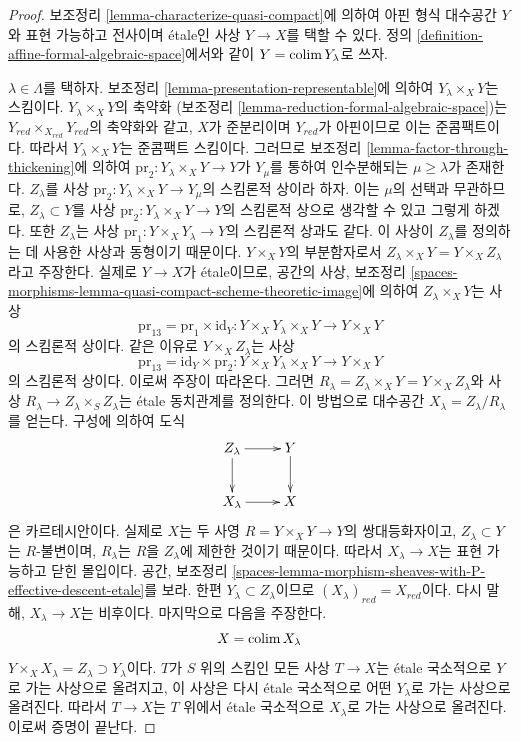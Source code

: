 \begin{proof}
보조정리 \ref{lemma-characterize-quasi-compact}에 의하여
아핀 형식 대수공간 $Y$와 표현 가능하고 전사이며 \'etale인 사상
$Y \to X$를 택할 수 있다. 정의
\ref{definition-affine-formal-algebraic-space}에서와 같이
$Y = \mathop{\mathrm{colim}}\nolimits Y_\lambda$로 쓰자.

\medskip\noindent
$\lambda \in \Lambda$를 택하자. 보조정리
\ref{lemma-presentation-representable}에 의하여
$Y_\lambda \times_X Y$는 스킴이다. $Y_\lambda \times_X Y$의 축약화
(보조정리 \ref{lemma-reduction-formal-algebraic-space})는
$Y_{red} \times_{X_{red}} Y_{red}$의 축약화와 같고,
$X$가 준분리이며 $Y_{red}$가 아핀이므로 이는 준콤팩트이다.
따라서 $Y_\lambda \times_X Y$는 준콤팩트 스킴이다.
그러므로 보조정리 \ref{lemma-factor-through-thickening}에 의하여
$\text{pr}_2 : Y_\lambda \times_X Y \to Y$가 $Y_\mu$를 통하여
인수분해되는 $\mu \geq \lambda$가 존재한다.
$Z_\lambda$를 사상
$\text{pr}_2 : Y_\lambda \times_X Y \to Y_\mu$의 스킴론적 상이라
하자. 이는 $\mu$의 선택과 무관하므로, $Z_\lambda \subset Y$를
사상 $\text{pr}_2 : Y_\lambda \times_X Y \to Y$의 스킴론적 상으로
생각할 수 있고 그렇게 하겠다. 또한 $Z_\lambda$는 사상
$\text{pr}_1 : Y \times_X Y_\lambda \to Y$의 스킴론적 상과도 같다.
이 사상이 $Z_\lambda$를 정의하는 데 사용한 사상과 동형이기 때문이다.
$Y \times_X Y$의 부분함자로서
$Z_\lambda \times_X Y = Y \times_X Z_\lambda$라고 주장한다.
실제로 $Y \to X$가 \'etale이므로, 공간의 사상, 보조정리
\ref{spaces-morphisms-lemma-quasi-compact-scheme-theoretic-image}에
의하여 $Z_\lambda \times_X Y$는 사상
$$
\text{pr}_{13} = \text{pr}_1 \times \text{id}_Y :
Y \times_X Y_\lambda \times_X Y \longrightarrow Y \times_X Y
$$
의 스킴론적 상이다. 같은 이유로 $Y \times_X Z_\lambda$는 사상
$$
\text{pr}_{13} = \text{id}_Y \times \text{pr}_2 : 
Y \times_X Y_\lambda \times_X Y \longrightarrow Y \times_X Y
$$
의 스킴론적 상이다. 이로써 주장이 따라온다. 그러면
$R_\lambda = Z_\lambda \times_X Y = Y \times_X Z_\lambda$와
사상 $R_\lambda \to Z_\lambda \times_S Z_\lambda$는
\'etale 동치관계를 정의한다. 이 방법으로 대수공간
$X_\lambda = Z_\lambda/R_\lambda$를 얻는다. 구성에 의하여 도식
$$
\xymatrix{
Z_\lambda \ar[r] \ar[d] & Y \ar[d] \\
X_\lambda \ar[r] & X
}
$$
은 카르테시안이다. 실제로 $X$는 두 사영
$R = Y \times_X Y \to Y$의 쌍대등화자이고,
$Z_\lambda \subset Y$는 $R$-불변이며,
$R_\lambda$는 $R$을 $Z_\lambda$에 제한한 것이기 때문이다.
따라서 $X_\lambda \to X$는 표현 가능하고 닫힌 몰입이다.
공간, 보조정리
\ref{spaces-lemma-morphism-sheaves-with-P-effective-descent-etale}를 보라.
한편 $Y_\lambda \subset Z_\lambda$이므로
$(X_\lambda)_{red} = X_{red}$이다. 다시 말해,
$X_\lambda \to X$는 비후이다. 마지막으로 다음을 주장한다.
$$
X = \mathop{\mathrm{colim}}\nolimits X_\lambda
$$
$Y \times_X X_\lambda = Z_\lambda \supset Y_\lambda$이다.
$T$가 $S$ 위의 스킴인 모든 사상 $T \to X$는 \'etale 국소적으로
$Y$로 가는 사상으로 올려지고, 이 사상은 다시 \'etale 국소적으로
어떤 $Y_\lambda$로 가는 사상으로 올려진다. 따라서
$T \to X$는 $T$ 위에서 \'etale 국소적으로 $X_\lambda$로 가는
사상으로 올려진다. 이로써 증명이 끝난다.
\end{proof}

